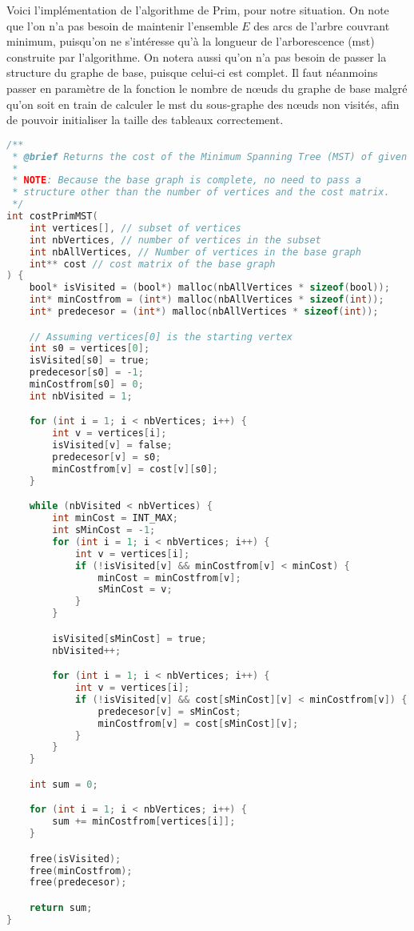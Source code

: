 Voici l'implémentation de l'algorithme de Prim, pour notre situation. On note que l'on n'a pas besoin de maintenir l'ensemble $E$ des arcs de l'arbre couvrant minimum, puisqu'on ne s'intéresse qu'à la longueur de l'arborescence (\acrshort{mst}) construite par l'algorithme. On notera aussi qu'on n'a pas besoin de passer la structure du graphe de base, puisque celui-ci est complet. Il faut néanmoins passer en paramètre de la fonction le nombre de nœuds du graphe de base malgré qu'on soit en train de calculer le \acrshort{mst} du sous-graphe des nœuds non visités, afin de pouvoir initialiser la taille des tableaux correctement.

\begin{lstlisting}[language=C, caption={Implémentation de l'algorithme de Prim pour calculer le coût du \acrshort{mst}.}]
/**
 * @brief Returns the cost of the Minimum Spanning Tree (MST) of given vertices.
 * 
 * NOTE: Because the base graph is complete, no need to pass a 
 * structure other than the number of vertices and the cost matrix.
 */
int costPrimMST(
    int vertices[], // subset of vertices
    int nbVertices, // number of vertices in the subset
    int nbAllVertices, // Number of vertices in the base graph
    int** cost // cost matrix of the base graph
) {
    bool* isVisited = (bool*) malloc(nbAllVertices * sizeof(bool));
    int* minCostfrom = (int*) malloc(nbAllVertices * sizeof(int));
    int* predecesor = (int*) malloc(nbAllVertices * sizeof(int));

    // Assuming vertices[0] is the starting vertex
    int s0 = vertices[0];
    isVisited[s0] = true;
    predecesor[s0] = -1;
    minCostfrom[s0] = 0;
    int nbVisited = 1;

    for (int i = 1; i < nbVertices; i++) {
        int v = vertices[i];
        isVisited[v] = false;
        predecesor[v] = s0;
        minCostfrom[v] = cost[v][s0];
    }

    while (nbVisited < nbVertices) {
        int minCost = INT_MAX;
        int sMinCost = -1;
        for (int i = 1; i < nbVertices; i++) {
            int v = vertices[i];
            if (!isVisited[v] && minCostfrom[v] < minCost) {
                minCost = minCostfrom[v];
                sMinCost = v;
            }
        }

        isVisited[sMinCost] = true;
        nbVisited++;

        for (int i = 1; i < nbVertices; i++) {
            int v = vertices[i];
            if (!isVisited[v] && cost[sMinCost][v] < minCostfrom[v]) {
                predecesor[v] = sMinCost;
                minCostfrom[v] = cost[sMinCost][v];
            }
        }
    }

    int sum = 0;

    for (int i = 1; i < nbVertices; i++) {
        sum += minCostfrom[vertices[i]];
    }

    free(isVisited);
    free(minCostfrom);
    free(predecesor);

    return sum;
}
\end{lstlisting}

